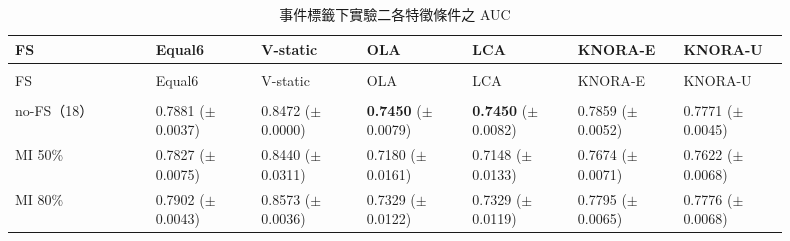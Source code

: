 \begingroup
\small{}\setlength{\tabcolsep}{3pt}
\setlength{\LTleft}{\fill}\setlength{\LTright}{\fill}
\begin{longtable}{@{}>{\raggedright\arraybackslash}p{0.16\linewidth}>{\raggedright\arraybackslash}p{0.123\linewidth}>{\raggedright\arraybackslash}p{0.123\linewidth}>{\raggedright\arraybackslash}p{0.123\linewidth}>{\raggedright\arraybackslash}p{0.123\linewidth}>{\raggedright\arraybackslash}p{0.123\linewidth}>{\raggedright\arraybackslash}p{0.123\linewidth}@{}}
\caption{事件標籤下實驗二各特徵條件之 AUC}\label{tab:results-fs-auc}\\
\toprule
FS & Equal6 & V-static & OLA & LCA & KNORA-E & KNORA-U \\
\midrule\endfirsthead
\multicolumn{7}{c}{表~\thetable（續）}\\
\toprule
FS & Equal6 & V-static & OLA & LCA & KNORA-E & KNORA-U \\
\midrule\endhead
\midrule\multicolumn{7}{r}{續下頁}\\\endfoot
\bottomrule\endlastfoot
no-FS（18） & \shortstack[l]{0.7881\\{\scriptsize(\(\pm\)0.0037)}} & \shortstack[l]{0.8472\\{\scriptsize(\(\pm\)0.0000)}} & \shortstack[l]{\textbf{0.7450}\\{\scriptsize(\(\pm\)0.0079)}} & \shortstack[l]{\textbf{0.7450}\\{\scriptsize(\(\pm\)0.0082)}} & \shortstack[l]{0.7859\\{\scriptsize(\(\pm\)0.0052)}} & \shortstack[l]{0.7771\\{\scriptsize(\(\pm\)0.0045)}} \\
MI 50\% & \shortstack[l]{0.7827\\{\scriptsize(\(\pm\)0.0075)}} & \shortstack[l]{0.8440\\{\scriptsize(\(\pm\)0.0311)}} & \shortstack[l]{0.7180\\{\scriptsize(\(\pm\)0.0161)}} & \shortstack[l]{0.7148\\{\scriptsize(\(\pm\)0.0133)}} & \shortstack[l]{0.7674\\{\scriptsize(\(\pm\)0.0071)}} & \shortstack[l]{0.7622\\{\scriptsize(\(\pm\)0.0068)}} \\
MI 80\% & \shortstack[l]{0.7902\\{\scriptsize(\(\pm\)0.0043)}} & \shortstack[l]{0.8573\\{\scriptsize(\(\pm\)0.0036)}} & \shortstack[l]{0.7329\\{\scriptsize(\(\pm\)0.0122)}} & \shortstack[l]{0.7329\\{\scriptsize(\(\pm\)0.0119)}} & \shortstack[l]{0.7795\\{\scriptsize(\(\pm\)0.0065)}} & \shortstack[l]{0.7776\\{\scriptsize(\(\pm\)0.0068)}} \\

\end{longtable}
